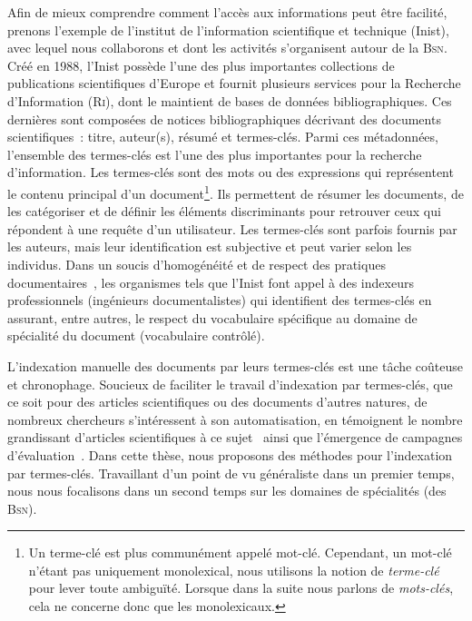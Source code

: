     Afin de mieux comprendre comment l'accès aux informations peut être
    facilité, prenons l'exemple de l'institut de l'information scientifique et
    technique (Inist), avec lequel nous collaborons et dont les activités
    s'organisent autour de la \textsc{Bsn}. Créé en 1988, l'Inist possède l'une
    des plus importantes collections de publications scientifiques d'Europe et
    fournit plusieurs services pour la Recherche d'Information (\textsc{Ri}),
    dont le maintient de bases de données bibliographiques. Ces dernières sont
    composées de notices bibliographiques décrivant des documents
    scientifiques~: titre, auteur(s), résumé et termes-clés. Parmi ces
    métadonnées, l'ensemble des termes-clés est l'une des plus importantes pour
    la recherche d'information. Les termes-clés sont des mots ou des expressions
    qui représentent le contenu principal d'un document\footnote{Un terme-clé
    est plus communément appelé mot-clé. Cependant, un mot-clé n'étant pas
    uniquement monolexical, nous utilisons la notion de \textit{terme-clé} pour
    lever toute ambiguïté. Lorsque dans la suite nous parlons de
    \textit{mots-clés}, cela ne concerne donc que les monolexicaux.}. Ils
    permettent de résumer les documents, de les catégoriser et de définir les
    éléments discriminants pour retrouver ceux qui répondent à une requête d'un
    utilisateur. Les termes-clés sont parfois fournis par les auteurs, mais leur
    identification est subjective et peut varier selon les individus. Dans un
    soucis d'homogénéité et de respect des pratiques
    documentaires~\cite{guinchat1996techniquesdocumentaires}, les organismes
    tels que l'Inist font appel à des indexeurs professionnels (ingénieurs
    documentalistes) qui identifient des termes-clés en assurant, entre autres,
    le respect du vocabulaire spécifique au domaine de spécialité du document
    (vocabulaire contrôlé).

    L'indexation manuelle des documents par leurs termes-clés est une tâche
    coûteuse et chronophage. Soucieux de faciliter le travail d'indexation par
    termes-clés, que ce soit pour des articles scientifiques ou des documents
    d'autres natures, de nombreux chercheurs s'intéressent à son automatisation,
    en témoignent le nombre grandissant d'articles scientifiques à ce
    sujet~\cite{hasan2014state_of_the_art} ainsi que l'émergence de campagnes
    d'évaluation~\cite{kim2010semeval,paroubek2012deft}. Dans cette thèse, nous
    proposons des méthodes pour l'indexation par termes-clés. Travaillant d'un
    point de vu généraliste dans un premier temps, nous nous focalisons dans un
    second temps sur les domaines de spécialités (des \textsc{Bsn}).

